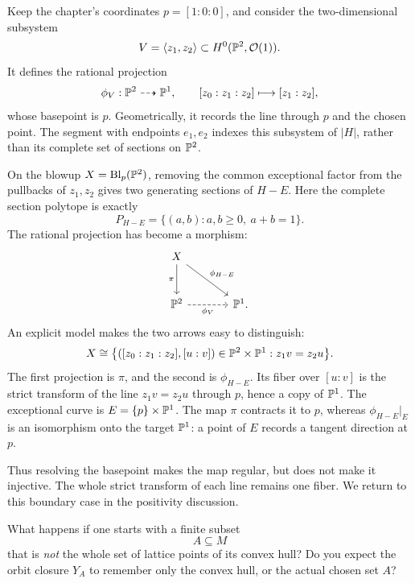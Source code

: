 \begin{example}
\label{ex:classroom-projection-pencil}
Keep the chapter's coordinates \(p=[1:0:0]\), and consider the
two-dimensional subsystem
\[
V=\langle z_1,z_2\rangle\subset H^0(\PP^2,\mathcal O(1)).
\]
It defines the rational projection
\[
\phi_V:\PP^2\dashrightarrow\PP^1,\qquad
[z_0:z_1:z_2]\longmapsto[z_1:z_2],
\]
whose basepoint is \(p\). Geometrically, it records the line through
\(p\) and the chosen point. The segment with endpoints \(e_1,e_2\)
indexes this subsystem of \(|H|\), rather than its complete set of
sections on \(\PP^2\).

On the blowup \(X=\Blp{\PP^2}{p}\), removing the common exceptional
factor from the pullbacks of \(z_1,z_2\) gives two generating sections
of \(H-E\). Here the complete section polytope is exactly
\[
P_{H-E}=\{(a,b):a,b\geq0,\ a+b=1\}.
\]
The rational projection has become a morphism:
\[
\begin{tikzcd}[column sep=large,row sep=large]
X \arrow[d,"\pi"'] \arrow[dr,"\phi_{H-E}"] & \\
\PP^2 \arrow[r,dashed,"\phi_V"'] & \PP^1.
\end{tikzcd}
\]
An explicit model makes the two arrows easy to distinguish:
\[
X\cong
\bigl\{([z_0:z_1:z_2],[u:v])\in\PP^2\times\PP^1:
z_1v=z_2u\bigr\}.
\]
The first projection is \(\pi\), and the second is
\(\phi_{H-E}\). Its fiber over \([u:v]\) is the strict transform of
the line \(z_1v=z_2u\) through \(p\), hence a copy of \(\PP^1\).
The exceptional curve is \(E=\{p\}\times\PP^1\). The map \(\pi\)
contracts it to \(p\), whereas \(\phi_{H-E}|_E\) is an isomorphism
onto the target \(\PP^1\): a point of \(E\) records a tangent
direction at \(p\).

Thus resolving the basepoint makes the map regular, but does not make
it injective. The whole strict transform of each line remains one
fiber. We return to this boundary case in the positivity discussion.
\end{example}

\begin{pauseandthink}
What happens if one starts with a finite subset
\[
A\subseteq M
\]
that is \emph{not} the whole set of lattice points of its convex hull?
Do you expect the orbit closure \(Y_A\) to remember only the convex
hull, or the actual chosen set \(A\)?
\end{pauseandthink}

